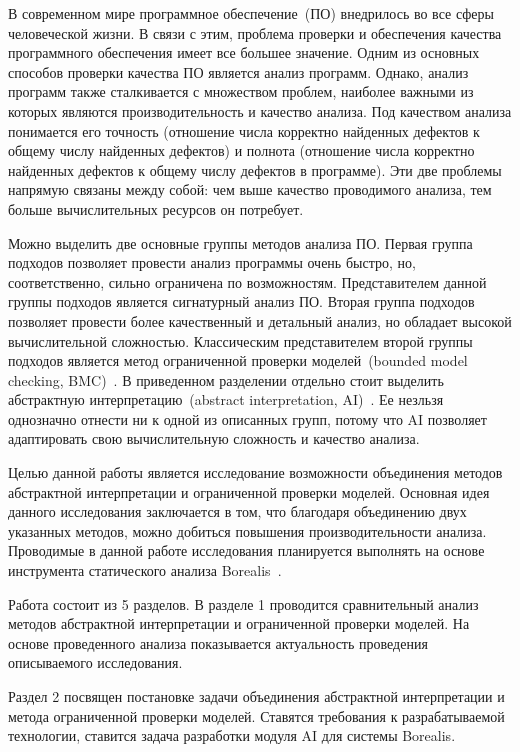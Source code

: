 \intro
В современном мире программное обеспечение~(ПО) внедрилось во все сферы 
человеческой жизни. В связи с этим, проблема проверки и обеспечения качества 
программного обеспечения имеет все большее значение. Одним из основных способов 
проверки качества ПО является анализ программ. Однако, анализ программ также 
сталкивается с множеством проблем, наиболее важными из которых являются 
производительность и качество анализа. Под качеством анализа понимается его 
точность (отношение числа корректно найденных дефектов к общему числу найденных 
дефектов) и полнота (отношение числа корректно найденных дефектов к общему 
числу дефектов в программе). Эти две проблемы напрямую связаны между собой:
чем выше качество проводимого анализа, тем больше вычислительных ресурсов он 
потребует.

Можно выделить две основные группы методов анализа ПО. Первая группа подходов 
позволяет провести анализ программы очень быстро, но, соответственно, сильно
ограничена по возможностям. Представителем данной группы подходов является 
сигнатурный анализ ПО. Вторая группа подходов позволяет провести более 
качественный и детальный анализ, но обладает высокой вычислительной сложностью.
Классическим представителем второй группы подходов является метод ограниченной 
проверки моделей~(bounded model checking, BMC)~\cite{bmc}. В приведенном 
разделении отдельно стоит выделить абстрактную интерпретацию~(abstract 
interpretation, AI)~\cite{ai}. Ее незльзя однозначно отнести ни к одной 
из описанных групп, потому что AI позволяет адаптировать свою вычислительную 
сложность и качество анализа.

Целью данной работы является исследование возможности объединения методов 
абстрактной интерпретации и ограниченной проверки моделей. Основная идея 
данного исследования заключается в том, что благодаря объединению двух 
указанных методов, можно добиться повышения производительности анализа. 
Проводимые в данной работе исследования планируется выполнять на основе 
инструмента статического анализа Borealis~\cite{borealis}.

Работа состоит из 5 разделов. В разделе 1 проводится сравнительный анализ 
методов абстрактной интерпретации и ограниченной проверки моделей. На основе 
проведенного анализа показывается актуальность проведения описываемого 
исследования.

Раздел 2 посвящен постановке задачи объединения абстрактной интерпретации и
метода ограниченной проверки моделей. Ставятся требования к разрабатываемой 
технологии, ставится задача разработки модуля AI для системы Borealis.

